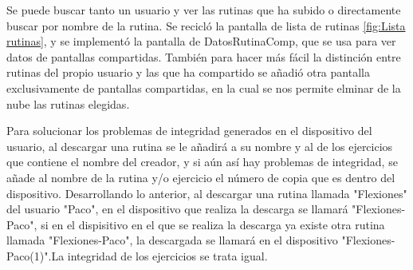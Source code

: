 Se puede buscar tanto un usuario y ver las rutinas que ha subido o directamente buscar por nombre de la rutina. Se recicló la pantalla de lista de rutinas \cref{fig:Lista rutinas}, y se implementó la pantalla de DatosRutinaComp, que se usa para ver datos de pantallas compartidas. También para hacer más fácil la distinción entre rutinas del propio usuario y las que ha compartido se añadió otra pantalla exclusivamente de pantallas compartidas, en la cual se nos permite elminar de la nube las rutinas elegidas.

Para solucionar los problemas de integridad generados en el dispositivo del usuario, al descargar una rutina se le añadirá a su nombre y al de los ejercicios que contiene el nombre del creador, y si aún así hay problemas de integridad, se añade al nombre de la rutina y/o ejercicio el número de copia que es dentro del dispositivo. Desarrollando lo anterior, al descargar una rutina llamada "Flexiones" del usuario "Paco", en el dispositivo que realiza la descarga se llamará "Flexiones-Paco", si en el dispisitivo en el que se realiza la descarga ya existe otra rutina llamada "Flexiones-Paco", la descargada se llamará en el dispositivo "Flexiones-Paco(1)".La integridad de los ejercicios se trata igual.


